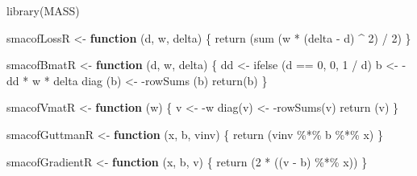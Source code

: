 \documentclass[
  12pt,
]{book}
\newenvironment{Shaded}{\begin{snugshade}}{\end{snugshade}}
\newcommand{\ControlFlowTok}[1]{\textcolor[rgb]{0.13,0.29,0.53}{\textbf{#1}}}
\newcommand{\DecValTok}[1]{\textcolor[rgb]{0.00,0.00,0.81}{#1}}
\newcommand{\FunctionTok}[1]{\textcolor[rgb]{0.00,0.00,0.00}{#1}}
\newcommand{\NormalTok}[1]{#1}
\newcommand{\OtherTok}[1]{\textcolor[rgb]{0.56,0.35,0.01}{#1}}
\newcommand{\SpecialCharTok}[1]{\textcolor[rgb]{0.00,0.00,0.00}{#1}}
\theoremstyle{definition}
\theoremstyle{definition}
\theoremstyle{definition}
\theoremstyle{definition}
\theoremstyle{remark}
\begin{document}
\begin{Shaded}
\begin{Highlighting}[]
\FunctionTok{library}\NormalTok{(MASS)}

\NormalTok{smacofLossR }\OtherTok{\textless{}{-}} \ControlFlowTok{function}\NormalTok{ (d, w, delta) \{}
  \FunctionTok{return}\NormalTok{ (}\FunctionTok{sum}\NormalTok{ (w }\SpecialCharTok{*}\NormalTok{ (delta }\SpecialCharTok{{-}}\NormalTok{ d) }\SpecialCharTok{\^{}} \DecValTok{2}\NormalTok{) }\SpecialCharTok{/} \DecValTok{2}\NormalTok{)}
\NormalTok{\}}

\NormalTok{smacofBmatR }\OtherTok{\textless{}{-}} \ControlFlowTok{function}\NormalTok{ (d, w, delta) \{}
\NormalTok{  dd }\OtherTok{\textless{}{-}} \FunctionTok{ifelse}\NormalTok{ (d }\SpecialCharTok{==} \DecValTok{0}\NormalTok{, }\DecValTok{0}\NormalTok{, }\DecValTok{1} \SpecialCharTok{/}\NormalTok{ d)}
\NormalTok{  b }\OtherTok{\textless{}{-}} \SpecialCharTok{{-}}\NormalTok{dd }\SpecialCharTok{*}\NormalTok{ w }\SpecialCharTok{*}\NormalTok{ delta}
  \FunctionTok{diag}\NormalTok{ (b) }\OtherTok{\textless{}{-}} \SpecialCharTok{{-}}\FunctionTok{rowSums}\NormalTok{ (b)}
  \FunctionTok{return}\NormalTok{(b)}
\NormalTok{\}}

\NormalTok{smacofVmatR }\OtherTok{\textless{}{-}} \ControlFlowTok{function}\NormalTok{ (w) \{}
\NormalTok{  v }\OtherTok{\textless{}{-}} \SpecialCharTok{{-}}\NormalTok{w}
  \FunctionTok{diag}\NormalTok{(v) }\OtherTok{\textless{}{-}} \SpecialCharTok{{-}}\FunctionTok{rowSums}\NormalTok{(v)}
  \FunctionTok{return}\NormalTok{ (v)}
\NormalTok{\}}

\NormalTok{smacofGuttmanR }\OtherTok{\textless{}{-}} \ControlFlowTok{function}\NormalTok{ (x, b, vinv) \{}
  \FunctionTok{return}\NormalTok{ (vinv }\SpecialCharTok{\%*\%}\NormalTok{ b }\SpecialCharTok{\%*\%}\NormalTok{ x)}
\NormalTok{\}}

\NormalTok{smacofGradientR }\OtherTok{\textless{}{-}} \ControlFlowTok{function}\NormalTok{ (x, b, v) \{}
  \FunctionTok{return}\NormalTok{ (}\DecValTok{2} \SpecialCharTok{*}\NormalTok{ ((v }\SpecialCharTok{{-}}\NormalTok{ b) }\SpecialCharTok{\%*\%}\NormalTok{ x))}
\NormalTok{\}}


\end{Highlighting}
\end{Shaded}
\end{document}
